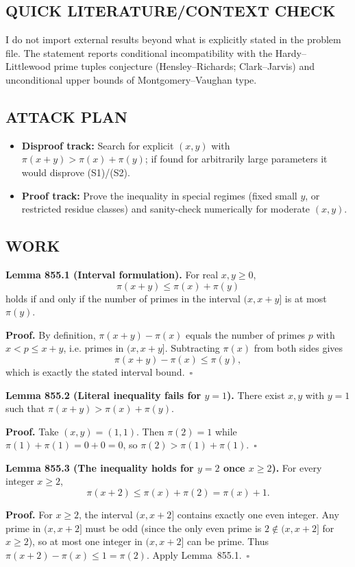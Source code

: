 \subsection*{QUICK LITERATURE/CONTEXT CHECK}
I do not import external results beyond what is explicitly stated in the problem file. The statement reports conditional incompatibility with the Hardy--Littlewood prime tuples conjecture (Hensley--Richards; Clark--Jarvis) and unconditional upper bounds of Montgomery--Vaughan type.

\subsection*{ATTACK PLAN}
\begin{itemize}
\item \textbf{Disproof track:} Search for explicit $(x,y)$ with $\pi(x+y)>\pi(x)+\pi(y)$; if found for arbitrarily large parameters it would disprove (S1)/(S2).
\item \textbf{Proof track:} Prove the inequality in special regimes (fixed small $y$, or restricted residue classes) and sanity-check numerically for moderate $(x,y)$.
\end{itemize}

\subsection*{WORK}
\textbf{Lemma 855.1 (Interval formulation).}
For real $x,y\ge 0$,
\[
  \pi(x+y) \le \pi(x)+\pi(y)
\]
holds if and only if the number of primes in the interval $(x,x+y]$ is at most $\pi(y)$.

\textbf{Proof.}
By definition, $\pi(x+y)-\pi(x)$ equals the number of primes $p$ with $x<p\le x+y$, i.e. primes in $(x,x+y]$. Subtracting $\pi(x)$ from both sides gives
\[
  \pi(x+y)-\pi(x) \le \pi(y),
\]
which is exactly the stated interval bound.\ $\square$

\medskip
\textbf{Lemma 855.2 (Literal inequality fails for $y=1$).}
There exist $x,y$ with $y=1$ such that $\pi(x+y) > \pi(x)+\pi(y)$.

\textbf{Proof.}
Take $(x,y)=(1,1)$. Then $\pi(2)=1$ while $\pi(1)+\pi(1)=0+0=0$, so $\pi(2)>\pi(1)+\pi(1)$.\ $\square$

\medskip
\textbf{Lemma 855.3 (The inequality holds for $y=2$ once $x\ge 2$).}
For every integer $x\ge 2$,
\[
  \pi(x+2) \le \pi(x)+\pi(2)=\pi(x)+1.
\]

\textbf{Proof.}
For $x\ge 2$, the interval $(x,x+2]$ contains exactly one even integer. Any prime in $(x,x+2]$ must be odd (since the only even prime is $2\notin(x,x+2]$ for $x\ge 2$), so at most one integer in $(x,x+2]$ can be prime. Thus $\pi(x+2)-\pi(x)\le 1=\pi(2)$. Apply Lemma~855.1.\ $\square$

